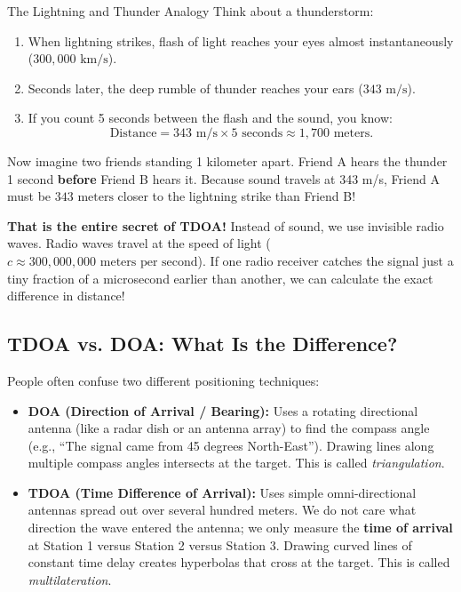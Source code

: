\documentclass[11pt,a4paper]{article}
\begin{document}
\begin{analogybox}{The Lightning and Thunder Analogy}
Think about a thunderstorm:
\begin{enumerate}[leftmargin=*]
    \item When lightning strikes, flash of light reaches your eyes almost instantaneously ($300{,}000\text{ km/s}$).
    \item Seconds later, the deep rumble of thunder reaches your ears ($343\text{ m/s}$).
    \item If you count 5 seconds between the flash and the sound, you know:
    $$\text{Distance} = 343\text{ m/s} \times 5\text{ seconds} \approx 1{,}700\text{ meters}.$$
\end{enumerate}
Now imagine two friends standing 1 kilometer apart. Friend A hears the thunder 1 second \textbf{before} Friend B hears it. Because sound travels at 343 m/s, Friend A must be $343\text{ meters}$ closer to the lightning strike than Friend B! 

\textbf{That is the entire secret of TDOA!} Instead of sound, we use invisible radio waves. Radio waves travel at the speed of light ($c \approx 300{,}000{,}000\text{ meters per second}$). If one radio receiver catches the signal just a tiny fraction of a microsecond earlier than another, we can calculate the exact difference in distance!
\end{analogybox}

\subsection{TDOA vs. DOA: What Is the Difference?}
People often confuse two different positioning techniques:
\begin{itemize}[leftmargin=*]
    \item \textbf{DOA (Direction of Arrival / Bearing):} Uses a rotating directional antenna (like a radar dish or an antenna array) to find the compass angle (e.g., ``The signal came from 45 degrees North-East''). Drawing lines along multiple compass angles intersects at the target. This is called \textit{triangulation}.
    \item \textbf{TDOA (Time Difference of Arrival):} Uses simple omni-directional antennas spread out over several hundred meters. We do not care what direction the wave entered the antenna; we only measure the \textbf{time of arrival} at Station 1 versus Station 2 versus Station 3. Drawing curved lines of constant time delay creates hyperbolas that cross at the target. This is called \textit{multilateration}.
\end{itemize}
\end{document}
